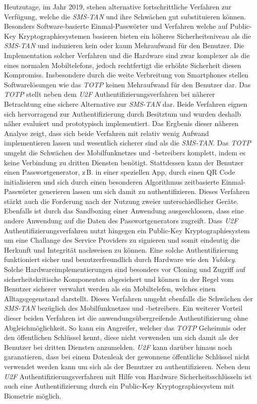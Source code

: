 \documentclass[11pt,a4paper,ngerman]{scrreprt}
\begin{document}
Heutzutage, im Jahr 2019, stehen alternative fortschrittliche Verfahren zur Verfügung, welche die \textit{SMS-TAN} und ihre Schwächen gut substituieren können. Besonders Software-basierte Einmal-Passwörter und Verfahren welche auf Public-Key Kryptographiesystemen basieren bieten ein höheres Sicherheitsniveau als die \textit{SMS-TAN} und induzieren kein oder kaum Mehraufwand für den Benutzer. Die Implementation solcher Verfahren und die Hardware sind zwar komplexer als die eines normalen Mobiltelefons, jedoch rechtfertigt die erhöhte Sicherheit diesen Kompromiss. Insbesondere durch die weite Verbreitung von Smartphones stellen Softwarelösungen wie das \textit{TOTP} keinen Mehraufwand für den Benutzer dar. Das \textit{TOTP} stellt neben dem \textit{U2F} Authentifizierungsverfahren bei näherer Betrachtung eine sichere Alternative zur \textit{SMS-TAN} dar. Beide Verfahren eignen sich hervorragend zur Authentifizierung durch Besitztum und wurden deshalb näher evaluiert und prototypisch implementiert. Das Ergbenis dieser näheren Analyse zeigt, dass sich beide Verfahren mit relativ wenig Aufwand implementieren lassen und wesentlich sicherer sind als die \textit{SMS-TAN}. Das \textit{TOTP} umgeht die Schwächen des Mobilfunknetzes und -betreibers komplett, indem es keine Verbindung zu dritten Diensten benötigt. Stattdessen kann der Benutzer einen Passwortgenerator, z\,B. in einer speziellen App, durch einen QR Code initialisieren und sich durch einen besonderen Algorithmus zeitbasierte Einmal-Passwörter generieren lassen um sich damit zu authentifizieren. Dieses Verfahren stärkt auch die Forderung nach der Nutzung zweier unterschiedlicher Geräte. Ebenfalls ist durch das Sandboxing einer Anwendung ausgeschlossen, dass eine andere Anwendung auf die Daten des Passwortgenerators zugreift. Dass \textit{U2F} Authentifizierungsverfahren nutzt hingegen ein Public-Key Kryptographiesystem um eine Challange des Service Providers zu signieren und somit eindeutig die Herkunft und Integrität nachweisen zu können. Eine solche Authentifizierung funktioniert sicher und benutzerfreundlich durch Hardware wie den \textit{Yubikey}. Solche Hardwareimplementierungen sind besonders vor Cloning und Zugriff auf sicherheitskritische Komponenten abgesichert und können in der Regel vom Benutzer sicherer verwahrt werden als ein Mobiltelefen, welches einen Alltagsgegenstand darstellt. Dieses Verfahren umgeht ebenfalls die Schwächen der \textit{SMS-TAN} bezüglich des Mobilfunknetzes und -betreibers. Ein weiterer Vorteil dieser beiden Verfahren ist die anwendungsübergreifende Authentifizierung ohne Abgleichmöglichkeit. So kann ein Angreifer, welcher das \textit{TOTP} Geheimnis oder den öffentlichen Schlüssel kennt, diese nicht verwenden um sich damit als der Benutzer bei dritten Diensten anzumelden. \textit{U2F} kann darüber hinaus noch garanatieren, dass bei einem Datenleak der gewonnene öffentliche Schlüssel nicht verwendet werden kann um sich als der Benutzer zu authentifizieren. Neben dem \textit{U2F} Authentifizierungsverfahren mit Hilfe von Hardware Sicherheitsschlüsseln ist auch eine Authentifizierung durch ein Public-Key Kryptographiesystem mit Biometrie möglich.
\end{document}
